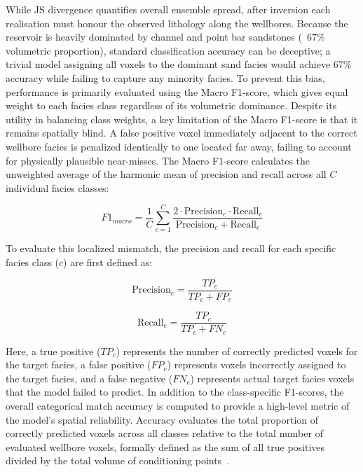 While JS divergence quantifies overall ensemble spread, after inversion each realisation must honour the observed lithology along the wellbores. Because the reservoir is heavily dominated by channel and point bar sandstones (~67\% volumetric proportion), standard classification accuracy can be deceptive; a trivial model assigning all voxels to the dominant sand facies would achieve 67\% accuracy while failing to capture any minority facies. To prevent this bias, performance is primarily evaluated using the Macro F1-score, which gives equal weight to each facies class regardless of its volumetric dominance. Despite its utility in balancing class weights, a key limitation of the Macro F1-score is that it remains spatially blind. A false positive voxel immediately adjacent to the correct wellbore facies is penalized identically to one located far away, failing to account for physically plausible near-misses. The Macro F1-score calculates the unweighted average of the harmonic mean of precision and recall across all $C$ individual facies classes:

\[ F1_{macro} = \frac{1}{C} \sum_{c=1}^{C} \frac{2 \cdot \text{Precision}_c \cdot \text{Recall}_c}{\text{Precision}_c + \text{Recall}_c} \]

To evaluate this localized mismatch, the precision and recall for each specific facies class ($c$) are first defined as:

\[ \text{Precision}_c = \frac{TP_c}{TP_c + FP_c} \]

\[ \text{Recall}_c = \frac{TP_c}{TP_c + FN_c} \]

Here, a true positive ($TP_c$) represents the number of correctly predicted voxels for the target facies, a false positive ($FP_c$) represents voxels incorrectly assigned to the target facies, and a false negative ($FN_c$) represents actual target facies voxels that the model failed to predict. In addition to the class-specific F1-scores, the overall categorical match accuracy is computed to provide a high-level metric of the model's spatial reliability. Accuracy evaluates the total proportion of correctly predicted voxels across all classes relative to the total number of evaluated wellbore voxels, formally defined as the sum of all true positives divided by the total volume of conditioning points~\parencite{Google2025AccuracyPrecision}.